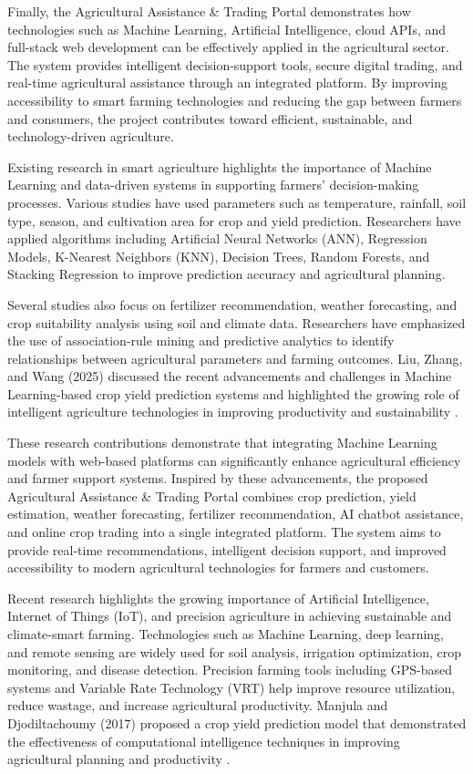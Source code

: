 Finally, the Agricultural Assistance \& Trading Portal demonstrates how technologies such as Machine Learning, Artificial Intelligence, cloud APIs, and full-stack web development can be effectively applied in the agricultural sector. The system provides intelligent decision-support tools, secure digital trading, and real-time agricultural assistance through an integrated platform. By improving accessibility to smart farming technologies and reducing the gap between farmers and consumers, the project contributes toward efficient, sustainable, and technology-driven agriculture.

Existing research in smart agriculture highlights the importance of Machine Learning and data-driven systems in supporting farmers' decision-making processes. Various studies have used parameters such as temperature, rainfall, soil type, season, and cultivation area for crop and yield prediction. Researchers have applied algorithms including Artificial Neural Networks (ANN), Regression Models, K-Nearest Neighbors (KNN), Decision Trees, Random Forests, and Stacking Regression to improve prediction accuracy and agricultural planning.

Several studies also focus on fertilizer recommendation, weather forecasting, and crop suitability analysis using soil and climate data. Researchers have emphasized the use of association-rule mining and predictive analytics to identify relationships between agricultural parameters and farming outcomes. Liu, Zhang, and Wang (2025) discussed the recent advancements and challenges in Machine Learning-based crop yield prediction systems and highlighted the growing role of intelligent agriculture technologies in improving productivity and sustainability \cite{ref3}.

These research contributions demonstrate that integrating Machine Learning models with web-based platforms can significantly enhance agricultural efficiency and farmer support systems. Inspired by these advancements, the proposed Agricultural Assistance \& Trading Portal combines crop prediction, yield estimation, weather forecasting, fertilizer recommendation, AI chatbot assistance, and online crop trading into a single integrated platform. The system aims to provide real-time recommendations, intelligent decision support, and improved accessibility to modern agricultural technologies for farmers and customers.

Recent research highlights the growing importance of Artificial Intelligence, Internet of Things (IoT), and precision agriculture in achieving sustainable and climate-smart farming. Technologies such as Machine Learning, deep learning, and remote sensing are widely used for soil analysis, irrigation optimization, crop monitoring, and disease detection. Precision farming tools including GPS-based systems and Variable Rate Technology (VRT) help improve resource utilization, reduce wastage, and increase agricultural productivity. Manjula and Djodiltachoumy (2017) proposed a crop yield prediction model that demonstrated the effectiveness of computational intelligence techniques in improving agricultural planning and productivity \cite{ref4}.

